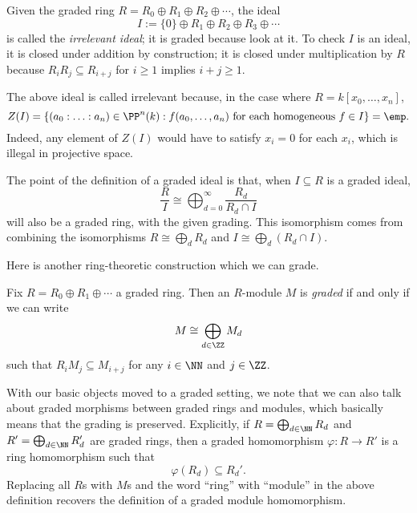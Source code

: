 \documentclass[../notes.tex]{subfiles}
\begin{document}
\begin{example} 
	Given the graded ring $R=R_0\oplus R_1\oplus R_2\oplus\cdots$, the ideal
	\[I:=\{0\}\oplus R_1\oplus R_2\oplus R_3\oplus\cdots\]
	is called the \textit{irrelevant ideal}; it is graded because look at it. To check $I$ is an ideal, it is closed under addition by construction; it is closed under multiplication by $R$ because $R_iR_j\subseteq R_{i+j}$ for $i\ge1$ implies $i+j\ge1$.
\end{example}
\begin{remark}
	The above ideal is called irrelevant because, in the case where $R=k[x_0,\ldots,x_n]$,
	\[Z(I)=\left\{(a_0:\ldots:a_n)\in\PP^n(k):f(a_0,\ldots,a_n)\text{ for each homogeneous }f\in I\right\}=\emp.\]
	Indeed, any element of $Z(I)$ would have to satisfy $x_i=0$ for each $x_i$, which is illegal in projective space.
\end{remark}
The point of the definition of a graded ideal is that, when $I\subseteq R$ is a graded ideal,
\[\frac RI\cong\bigoplus_{d=0}^\infty\frac{R_d}{R_d\cap I}\]
will also be a graded ring, with the given grading. This isomorphism comes from combining the isomorphisms $R\cong\bigoplus_dR_d$ and $I\cong\bigoplus_d(R_d\cap I)$.

Here is another ring-theoretic construction which we can grade.
\begin{definition}
	Fix $R=R_0\oplus R_1\oplus\cdots$ a graded ring. Then an $R$-module $M$ is \textit{graded} if and only if we can write
	\[M\cong\bigoplus_{d\in\ZZ}M_d\]
	such that $R_iM_j\subseteq M_{i+j}$ for any $i\in\NN$ and $j\in\ZZ$.
\end{definition}
\begin{remark}[Nir]
	With our basic objects moved to a graded setting, we note that we can also talk about graded morphisms between graded rings and modules, which basically means that the grading is preserved. Explicitly, if $R=\bigoplus_{d\in\NN}R_d$ and $R'=\bigoplus_{d\in\NN}R_d'$ are graded rings, then a graded homomorphism $\varphi:R\to R'$ is a ring homomorphism such that
	\[\varphi(R_d)\subseteq R_d'.\]
	Replacing all $R$s with $M$s and the word ``ring'' with ``module'' in the above definition recovers the definition of a graded module homomorphism.
\end{remark}
\end{document}
